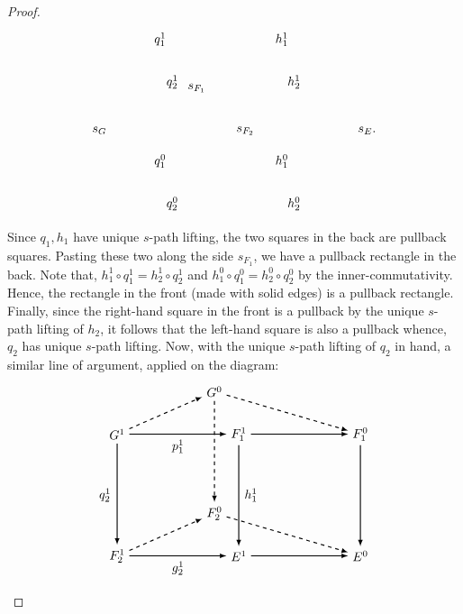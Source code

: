 \documentclass[a4paper,reqno,12pt]{amsart}
\theoremstyle{definition}
\theoremstyle{remark}
\begin{document}
\begin{proof}
\[\begin{tikzpicture}[scale=1.7]
\node at (1,-0.2) {$q_2^1$};
\node at (1,-2.2) {$q_2^0$};
\node at (-0.2,-1) {$s_G$};
\node at (2.2,-1) {$s_{F_2}$};

\node at (3,-0.2) {$h_2^1$};
\node at (3,-2.2) {$h_2^0$};
\node at (4.2,-1) {$s_E$.};

\node at (0.8,0.5) {$q_1^1$};
\node at (0.8,-1.5) {$q_1^0$};
\node at (2.8,0.5) {$h_1^1$};
\node at (2.8,-1.5) {$h_1^0$};

\node at (1.4,-0.3) {$s_{F_1}$};

\end{tikzpicture}
\] Since $q_1,h_1$ have unique $s$-path lifting, the two squares in the back are pullback squares. Pasting these two along the side $s_{F_1}$, we have a pullback rectangle in the back. Note that, $h_1^1\circ q_1^1=h_2^1\circ q_2^1$ and $h_1^0\circ q_1^0=h_2^0\circ q_2^0$ by the inner-commutativity. Hence, the rectangle in the front (made with solid edges) is a pullback rectangle. Finally, since the right-hand square in the front is a pullback by the unique $s$-path lifting of $h_2$, it follows that the left-hand square is also a pullback whence, $q_2$ has unique $s$-path lifting. Now, with the unique $s$-path lifting of $q_2$ in hand, a similar line of argument, applied on the diagram:
\[
\begin{tikzpicture}[scale=1.7]
\node[] (A1) at (0,0) {$G^1$};
\node[] (A2) at (2,0) {$F_1^1$};
\node[] (A3) at (0,-2) {$F_2^1$};
\node[] (A4) at (2,-2) {$E^1$};

\node[] (B1) at (1.6,0.7) {$G^0$};
\node[] (B2) at (4,0) {$F_1^0$};
\node[] (B3) at (1.6,-1.3) {$F_2^0$};
\node[] (B4) at (4,-2) {$E^0$};

\path[->, black, >=latex,thick] (A1) edge [] node[]{} (A2);
\path[->, black, >=latex,thick] (A3) edge [] node[]{} (A4);
\path[->, black, >=latex,thick] (A1) edge [] node[]{} (A3);
\path[->, black, >=latex,thick] (A2) edge [] node[]{} (A4);

\path[->,black, dashed, >=latex,thick] (B1) edge [] node[]{} (B3);
\path[->,black, >=latex,thick] (A4) edge [] node[]{} (B4);
\path[->,black, >=latex,thick] (A2) edge [] node[]{} (B2);
\path[->,black, >=latex,thick] (B2) edge [] node[]{} (B4);

\path[->,black, dashed, >=latex,thick] (A1) edge [] node {} (B1);
\path[->,black, dashed, >=latex,thick] (A3) edge [] node {} (B3);
\path[->,black, dashed, >=latex,thick] (B1) edge [] node {} (B2);
\path[->,black, dashed, >=latex,thick] (B3) edge [] node {} (B4);

\node at (1,-0.2) {$p_1^1$};
\node at (1,-2.2) {$g_2^1$};
\node at (-0.2,-1) {$q_2^1$};
\node at (2.2,-1) {$h_1^1$};


\end{tikzpicture}\]
\end{proof}
\end{document}
